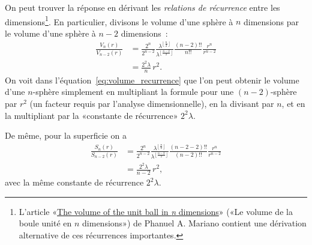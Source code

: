 On peut trouver la réponse en dérivant les \emph{relations de récurrence} entre
les dimensions\ns\footnote{L'article
«\ns \href{http://www2.math.uconn.edu/~mariano/research/MathClubsp14\%20.pdf}{The
volume of the unit ball in \emph{n} dimensions}\ns » («\ns Le volume de la boule
unité en $n$ dimensions\ns ») de Phanuel A. Mariano contient une dérivation
alternative de ces récurrences importantes.}. En particulier, divisons le
volume d'une sphère à $n$ dimensions par le volume d'une sphère à $n-2$
dimensions~:
\begin{equation}
\label{eq:volume_recurrence}
\begin{split}
\frac{V_n(r)}{V_{n-2}(r)} & =
\frac{2^n}{2^{n-2}}
\frac{\lambda^{\left\lfloor \frac{n}{2} \right\rfloor}}{\lambda^{\left\lfloor \frac{n-2}{2} \right\rfloor}}
\frac{(n-2)!!}{n!!}
\frac{r^{n}}{r^{n-2}}
\\ & = \frac{2^2\lambda}{n}\,r^2.
\end{split}
\end{equation}
On voit dans l'équation~\eqref{eq:volume_recurrence} que l'on peut obtenir le
volume d'une $n$-sphère simplement en multipliant la formule pour une
$(n-2)$-sphère par $r^2$ (un facteur requis par l'analyse dimensionnelle), en
la divisant par $n$, et en la multipliant par la «\ns constante de récurrence\ns »
$2^2\lambda$.

De même, pour la superficie on a
\begin{equation}
\label{eq:surface_area_recurrence}
\begin{split}
\frac{S_n(r)}{S_{n-2}(r)} & =
\frac{2^n}{2^{n-2}}
\frac{\lambda^{\left\lfloor \frac{n}{2} \right\rfloor}}{\lambda^{\left\lfloor \frac{n-2}{2} \right\rfloor}}
\frac{(n-2-2)!!}{(n-2)!!}
\frac{r^{n}}{r^{n-2}}
\\ & = \frac{2^2\lambda}{n-2}\,r^2,
\end{split}
\end{equation}
avec la même constante de récurrence $2^2\lambda$.

